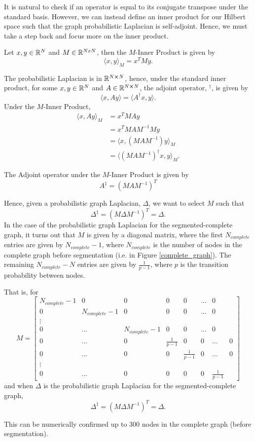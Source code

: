 It is natural to check if an operator is equal to its conjugate transpose under the standard basis. 
However, we can instead define an inner product for our Hilbert space such that the graph probabilistic Laplacian is self-adjoint.
Hence, we must take a step back and focus more on the inner product.
\begin{definition}
Let $x, y \in \mathbb{R}^N$ and $M \in \mathbb{R}^{NxN}$, then the $M$-Inner Product is given by
$$
\langle x, y \rangle_M = x^TMy.
$$
\end{definition}
The probabilistic Laplacian is in $\mathbb{R}^{N \cross N}$, hence, under the standard inner product, for some $x, y \in \mathbb{R}^N$ and $A \in \mathbb{R}^{N \cross N}$, the adjoint operator, $^{\dagger}$, is given by
$$
\langle x, Ay \rangle = \langle A^{\dagger}x, y \rangle.
$$
Under the $M$-Inner Product, 
\begin{align*}
\langle x, Ay \rangle_M &= x^TMAy\\
&= x^TMAM^{-1}My\\
&= \langle x, (MAM^{-1})y \rangle_M\\
&= \langle (MAM^{-1})^{\dagger} x, y \rangle_M.
\end{align*}
\begin{definition}[$M$-Adjoint]
The Adjoint operator under the $M$-Inner Product is given by
$$
A^{\ddag} = (MAM^{-1})^T
$$
\end{definition}
Hence, given a probabilistic graph Laplacian, $\Delta$, we want to select $M$ such that
$$
\Delta^{\ddag} = (M\Delta M^{-1})^T = \Delta.
$$
In the case of the probabilistic graph Laplacian for the segmented-complete graph,
it turns out that $M$ is given by a diagonal matrix, where the first $N_{complete}$ entries are given by $N_{complete} - 1$,
where $N_{complete}$ is the number of nodes in the complete graph before segmentation (i.e. in Figure \ref{complete_graph}).
The remaining $N_{complete} - N$ entries are given by $\frac{1}{p - 1}$, where $p$ is the transition probability between nodes.
\begin{proposition}
That is, for
$$
    M = \begin{bmatrix}
        N_{complete} - 1 & 0 & 0 & 0 & 0 & ... & 0\\
        0 & N_{complete} - 1 & 0 & 0 & 0 & ... & 0\\
        \vdots\\
        0 & ... & N_{complete} - 1   & 0 & 0 & ... & 0\\
        0 & ... & 0 & \frac{1}{p-1} & 0 & 0 & ... & 0\\
        0 & ... & 0 & 0 & \frac{1}{p-1} & 0 & ... & 0\\
        \vdots\\
        0 & ... & 0 & 0 & 0 & 0 & \frac{1}{p-1}
    \end{bmatrix}
$$
and when $\Delta$ is the probabilistic graph Laplacian for the segmented-complete graph,
$$
\Delta^{\ddag} = (M\Delta M^{-1})^T = \Delta.
$$
\end{proposition}
This can be numerically confirmed up to 300 nodes in the complete graph (before segmentation).

